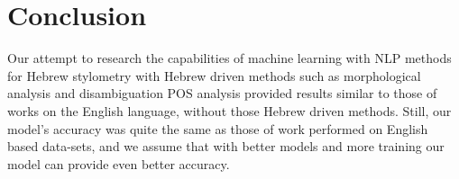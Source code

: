 \documentclass[a4paper]{article}
\begin{document}
\section{Conclusion}
\label{Conclusion}

Our attempt to research the capabilities of machine learning with NLP methods for Hebrew stylometry with Hebrew driven methods such as morphological analysis and disambiguation POS analysis provided results similar to those of works on the English language, without those Hebrew driven methods.
Still, our model's accuracy was quite the same as those of work performed on English based data-sets, and we assume that with better models and more training our model can provide even better accuracy.



\end{document}
